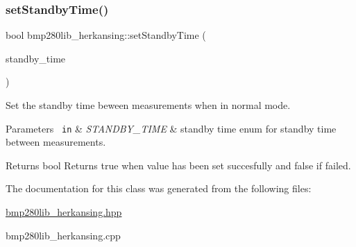 \subsubsection{\texorpdfstring{setStandbyTime()}{setStandbyTime()}}
{\footnotesize\ttfamily bool bmp280lib\+\_\+herkansing\+::set\+Standby\+Time (\begin{DoxyParamCaption}\item[{S\+T\+A\+N\+D\+B\+Y\+\_\+\+T\+I\+ME}]{standby\+\_\+time }\end{DoxyParamCaption})}



Set the standby time beween measurements when in normal mode. 


\begin{DoxyParams}[1]{Parameters}
\mbox{\texttt{ in}}  & {\em S\+T\+A\+N\+D\+B\+Y\+\_\+\+T\+I\+ME} & standby time enum for standby time between measurements. \\
\hline
\end{DoxyParams}
\begin{DoxyReturn}{Returns}
bool Returns true when value has been set succesfully and false if failed. 
\end{DoxyReturn}


The documentation for this class was generated from the following files\+:\begin{DoxyCompactItemize}
\item 
\mbox{\hyperlink{bmp280lib__herkansing_8hpp}{bmp280lib\+\_\+herkansing.\+hpp}}\item 
bmp280lib\+\_\+herkansing.\+cpp\end{DoxyCompactItemize}
